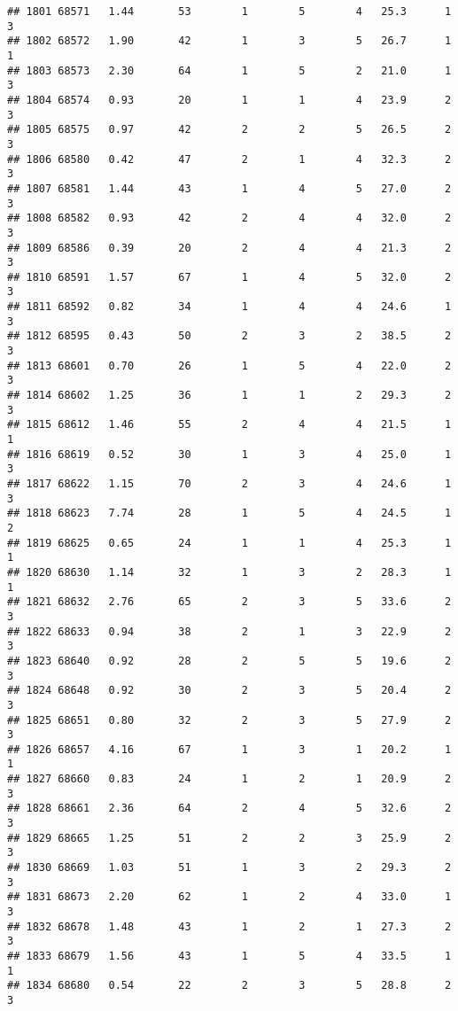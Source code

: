 \documentclass[
]{article}
\begin{document}
\begin{verbatim}
## 1801 68571   1.44       53        1        5        4   25.3      1      3
## 1802 68572   1.90       42        1        3        5   26.7      1      1
## 1803 68573   2.30       64        1        5        2   21.0      1      3
## 1804 68574   0.93       20        1        1        4   23.9      2      3
## 1805 68575   0.97       42        2        2        5   26.5      2      3
## 1806 68580   0.42       47        2        1        4   32.3      2      3
## 1807 68581   1.44       43        1        4        5   27.0      2      3
## 1808 68582   0.93       42        2        4        4   32.0      2      3
## 1809 68586   0.39       20        2        4        4   21.3      2      3
## 1810 68591   1.57       67        1        4        5   32.0      2      3
## 1811 68592   0.82       34        1        4        4   24.6      1      3
## 1812 68595   0.43       50        2        3        2   38.5      2      3
## 1813 68601   0.70       26        1        5        4   22.0      2      3
## 1814 68602   1.25       36        1        1        2   29.3      2      3
## 1815 68612   1.46       55        2        4        4   21.5      1      1
## 1816 68619   0.52       30        1        3        4   25.0      1      3
## 1817 68622   1.15       70        2        3        4   24.6      1      3
## 1818 68623   7.74       28        1        5        4   24.5      1      2
## 1819 68625   0.65       24        1        1        4   25.3      1      1
## 1820 68630   1.14       32        1        3        2   28.3      1      1
## 1821 68632   2.76       65        2        3        5   33.6      2      3
## 1822 68633   0.94       38        2        1        3   22.9      2      3
## 1823 68640   0.92       28        2        5        5   19.6      2      3
## 1824 68648   0.92       30        2        3        5   20.4      2      3
## 1825 68651   0.80       32        2        3        5   27.9      2      3
## 1826 68657   4.16       67        1        3        1   20.2      1      1
## 1827 68660   0.83       24        1        2        1   20.9      2      3
## 1828 68661   2.36       64        2        4        5   32.6      2      3
## 1829 68665   1.25       51        2        2        3   25.9      2      3
## 1830 68669   1.03       51        1        3        2   29.3      2      3
## 1831 68673   2.20       62        1        2        4   33.0      1      3
## 1832 68678   1.48       43        1        2        1   27.3      2      3
## 1833 68679   1.56       43        1        5        4   33.5      1      1
## 1834 68680   0.54       22        2        3        5   28.8      2      3

\end{verbatim}
\end{document}
